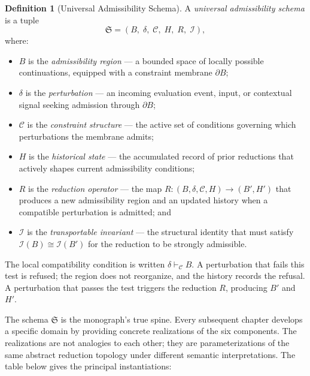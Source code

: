 \documentclass[12pt,openany]{book}
\theoremstyle{plain}
\theoremstyle{definition}
\newtheorem{definition}[theorem]{Definition}
\theoremstyle{remark}
\begin{document}
\begin{definition}[Universal Admissibility Schema]
\label{def:schema}
A \emph{universal admissibility schema} is a tuple
\[
  \mathfrak{S} = (B,\; \delta,\; \mathcal{C},\; H,\; R,\; \mathcal{I}),
\]
where:
\begin{itemize}
  \item $B$ is the \emph{admissibility region} — a bounded space of locally possible continuations, equipped with a constraint membrane $\partial B$;
  \item $\delta$ is the \emph{perturbation} — an incoming evaluation event, input, or contextual signal seeking admission through $\partial B$;
  \item $\mathcal{C}$ is the \emph{constraint structure} — the active set of conditions governing which perturbations the membrane admits;
  \item $H$ is the \emph{historical state} — the accumulated record of prior reductions that actively shapes current admissibility conditions;
  \item $R$ is the \emph{reduction operator} — the map $R : (B, \delta, \mathcal{C}, H) \to (B', H')$ that produces a new admissibility region and an updated history when a compatible perturbation is admitted; and
  \item $\mathcal{I}$ is the \emph{transportable invariant} — the structural identity that must satisfy $\mathcal{I}(B) \cong \mathcal{I}(B')$ for the reduction to be strongly admissible.
\end{itemize}
The local compatibility condition is written $\delta \vdash_{\mathcal{C}} B$. A perturbation that fails this test is refused; the region does not reorganize, and the history records the refusal. A perturbation that passes the test triggers the reduction $R$, producing $B'$ and $H'$.
\end{definition}

The schema $\mathfrak{S}$ is the monograph's true spine. Every subsequent chapter develops a specific domain by providing concrete realizations of the six components. The realizations are not analogies to each other; they are parameterizations of the same abstract reduction topology under different semantic interpretations. The table below gives the principal instantiations:
\end{document}
